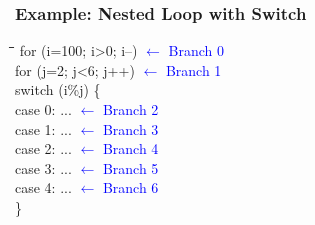 \documentclass[aspectratio=169,12pt]{beamer}
\begin{document}
\begin{frame}[fragile]
  \frametitle{Example: Nested Loop with Switch}
  
  \begin{tcolorbox}[colback=gray!5, colframe=gray!50]
    \small\ttfamily
    \begin{tabbing}
    \hspace{1em}\=\hspace{1em}\=\hspace{1em}\=\hspace{1em}\=\kill
    for (i=100; i>0; i--) \textcolor{blue}{$\leftarrow$ Branch 0}\\
    \> for (j=2; j<6; j++) \textcolor{blue}{$\leftarrow$ Branch 1}\\
    \> \> switch (i\%j) \{ \\
    \> \> \> case 0: ... \textcolor{blue}{$\leftarrow$ Branch 2}\\
    \> \> \> case 1: ... \textcolor{blue}{$\leftarrow$ Branch 3}\\
    \> \> \> case 2: ... \textcolor{blue}{$\leftarrow$ Branch 4}\\
    \> \> \> case 3: ... \textcolor{blue}{$\leftarrow$ Branch 5}\\
    \> \> \> case 4: ... \textcolor{blue}{$\leftarrow$ Branch 6}\\
    \> \> \}
    \end{tabbing}
  \end{tcolorbox}
    
\end{frame}
\end{document}
